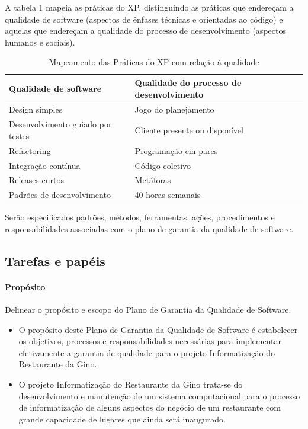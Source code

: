 A tabela 1 mapeia as práticas do XP, distinguindo as práticas que endereçam a qualidade de software (aspectos de ênfases técnicas e orientadas ao código) e aquelas que endereçam a qualidade do processo de desenvolvimento (aspectos humanos e sociais).

\begin{table}[htb]
      \begin{center}
        \begin{tabular}{| p{6cm} | p{6cm} |}
        \hline
        \textbf{Qualidade de software} & \textbf{Qualidade do processo de desenvolvimento}  \\ \hline
        Design simples & Jogo do planejamento \\ \hline
        Desenvolvimento guiado por testes & Cliente presente ou disponível \\ \hline
        Refactoring & Programação em pares \\ \hline
        Integração contínua & Código coletivo \\ \hline
        Releases curtos & Metáforas \\ \hline
        Padrões de desenvolvimento & 40 horas semanais \\ \hline
        
        
        \end{tabular}
      \end{center}
    \caption{Mapeamento das Práticas do XP com relação à qualidade}
    \end{table}

  Serão especificados padrões, métodos, ferramentas, ações, procedimentos e responsabilidades associadas com o plano de garantia da qualidade de software.

\subsection{Tarefas e papéis}

\paragraph{Propósito}
Delinear o propósito e escopo do Plano de Garantia da Qualidade de Software.

\begin{itemize}
\item O propósito deste Plano de Garantia da Qualidade de Software é estabelecer os objetivos, processos e responsabilidades necessárias para implementar efetivamente a garantia de qualidade para o projeto Informatização do Restaurante da Gino.

\item O projeto Informatização do Restaurante da Gino trata-se do desenvolvimento e manutenção de um sistema computacional para o processo de informatização de alguns aspectos do negócio de um restaurante com grande capacidade de lugares que ainda será inaugurado.
\end{itemize}


